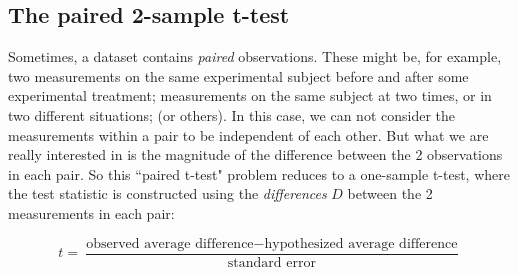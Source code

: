 \documentclass[twoside]{book}\usepackage[]{graphicx}\usepackage[]{xcolor}
\newcounter{example}[section]
\begin{document}
\subsection{The paired 2-sample t-test}
Sometimes, a dataset contains \emph{paired} observations.  These might be, for example, two measurements on the same experimental subject before and after some experimental treatment; measurements on the same subject at two times, or in two different situations; (or others).  In this case, we can not consider the measurements within a pair to be independent of each other.  But what we are really interested in is the magnitude of the difference between the 2 observations in each pair.  So this ``paired t-test" problem reduces to a one-sample t-test, where the test statistic is constructed using the \emph{differences} $D$ between the 2 measurements in each pair:

\[
t = \frac{\mbox{observed average difference} - \mbox{hypothesized average difference}}{\mbox{standard error}}
\]
\end{document}
